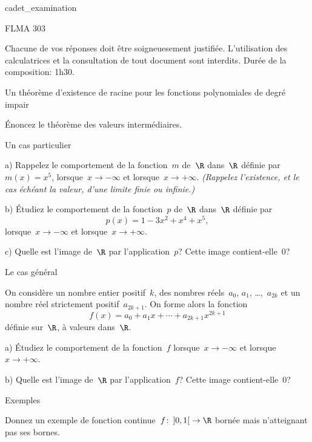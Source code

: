 

\class cadet_examination


\module         FLMA 303

\begindirectives
Chacune de vos réponses doit être soigneuesement justifiée.
L'utilisation des calculatrices et la consultation de tout document
sont interdits. Durée de la composition: 1h30.
\enddirectives

\exercise Un théorème d'existence de racine %
             pour les fonctions polynomiales de degré impair

\question
Énoncez le théorème des valeurs intermédiaires.


\question Un cas particulier

\item{a)}
Rappelez le comportement de la fonction~$m$ de~$\R$ dans~$\R$ définie
par~$m(x) = x^5$, lorsque~$x\to-\infty$ et
lorsque~$x\to+\infty$. \em{(Rappelez l'existence, et le cas échéant la
valeur, d'une limite finie ou infinie.)}

\item{b)}
Étudiez le comportement de la fonction~$p$ de~$\R$ dans~$\R$ définie
par
$$
p(x) = 1 - 3x^2 + x^4 + x^5
,
$$
lorsque~$x\to-\infty$ et lorsque~$x\to+\infty$.

\item{c)}
Quelle est l'image de~$\R$ par l'application~$p$? Cette image
contient-elle~$0$?


\question Le cas général

On considère un nombre entier positif~$k$, des nombres réels~$a_0$,
$a_1$, \dots,~$a_{2k}$ et un nombre réel strictement
positif~$a_{2k+1}$. On forme alors la fonction
$$
f(x) = a_0 + a_1 x + \cdots + a_{2k+1} x^{2k+1}
$$
définie sur~$\R$, à valeurs dans~$\R$.

\item{a)}
Étudiez le comportement de la fonction~$f$ lorsque~$x\to-\infty$ et
lorsque~$x\to+\infty$.

\item{b)}
Quelle est l'image de~$\R$ par l'application~$f$? Cette image
contient-elle~$0$?


\exercise Exemples

\question
Donnez un exemple de fonction continue~$f\colon\left]0,1\right[\to\R$ bornée mais
n'atteignant pas ses bornes.

